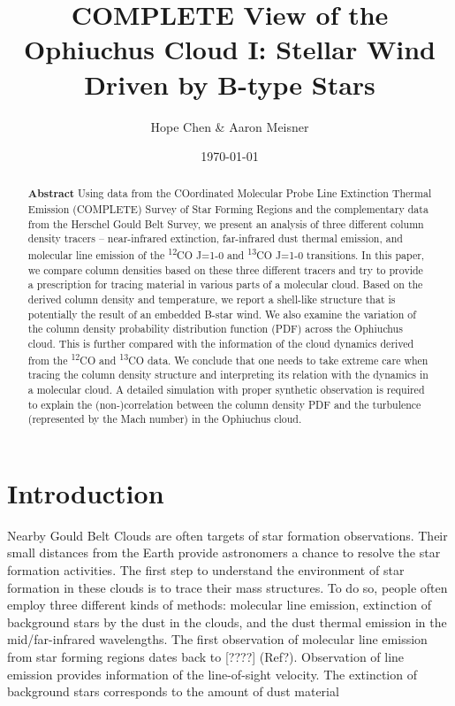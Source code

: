 \documentclass[11pt,a4paper]{emulateapj}
\begin{document}
\title{COMPLETE View of the Ophiuchus Cloud I: Stellar Wind Driven by B-type Stars}
\author{Hope Chen \& Aaron Meisner}
\date{\today}


%
%

\begin{abstract}
\textbf{Abstract} Using data from the COordinated Molecular Probe Line
Extinction Thermal Emission (COMPLETE) Survey of Star Forming Regions
and the complementary data from the Herschel Gould Belt Survey, we
present an analysis of three different column density tracers --
near-infrared extinction, far-infrared dust thermal emission, and
molecular line emission of the \textsuperscript{12}CO J=1-0 and
\textsuperscript{13}CO J=1-0 transitions. In this paper, we compare
column densities based on these three different tracers and try to
provide a prescription for tracing material in various parts of a
molecular cloud. Based on the derived column density and temperature, we
report a shell-like structure that is potentially the result of an
embedded B-star wind. We also examine the variation of the column
density probability distribution function (PDF) across the Ophiuchus
cloud. This is further compared with the information of the cloud
dynamics derived from the \textsuperscript{12}CO and
\textsuperscript{13}CO data. We conclude that one needs to take extreme
care when tracing the column density structure and interpreting its
relation with the dynamics in a molecular cloud. A detailed simulation
with proper synthetic observation is required to explain the
(non-)correlation between the column density PDF and the turbulence
(represented by the Mach number) in the Ophiuchus cloud.

\end{abstract}

\section{Introduction}
\label{sec:introduction}
Nearby Gould Belt Clouds are often targets of star formation observations. Their small distances from the Earth provide astronomers a chance to resolve the star formation activities. The first step to understand the environment of star formation in these clouds is to trace their mass structures. To do so, people often employ three different kinds of methods: molecular line emission, extinction of background stars by the dust in the clouds, and the dust thermal emission in the mid/far-infrared wavelengths.
The first observation of molecular line emission from star forming regions dates back to [????] (Ref?). Observation of line emission provides information of the line-of-sight velocity.
The extinction of background stars corresponds to the amount of dust material 
\end{document}
